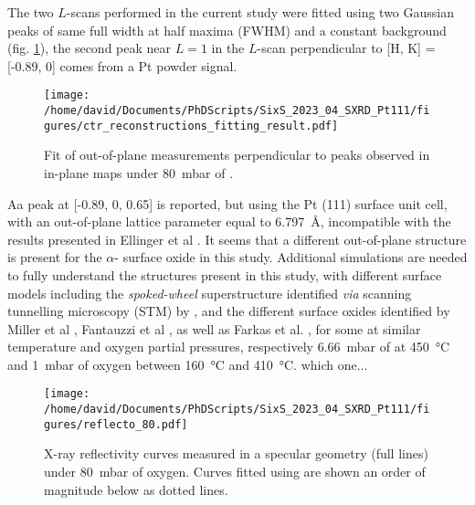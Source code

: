 The two $L$-scans performed in the current study were fitted using two Gaussian peaks of same full width at half maxima (FWHM) and a constant background (fig. \ref{fig:LScans80Fit}), the second peak near $L=1$ in the $L$-scan perpendicular to [H, K] = [-0.89, 0] comes from a Pt powder signal.

\begin{figure}[!htb]
    \centering
    \texttt{[image: /home/david/Documents/PhDScripts/SixS\_2023\_04\_SXRD\_Pt111/figures/ctr\_reconstructions\_fitting\_result.pdf]}
    \caption{
        Fit of out-of-plane measurements perpendicular to peaks observed in in-plane maps under \qty{80}{\milli\bar} of .
    }
    \label{fig:LScans80Fit}
\end{figure}

Aa peak at [-0.89, 0, 0.65] is reported, but using the Pt (111) surface unit cell, with an out-of-plane lattice parameter equal to \qty{6.797}{\angstrom}, incompatible with the results presented in Ellinger et al \parencite*{Ellinger2008}.
It seems that a different out-of-plane structure is present for the $\alpha$- surface oxide in this study.
Additional simulations are needed to fully understand the structures present in this study, with different surface models including the \textit{spoked-wheel} superstructure identified \textit{via} scanning tunnelling microscopy (STM) by \cite{VanSpronsen2017, Boden2022}, and the different surface oxides identified by Miller et al \parencite*{Miller2011, Miller2014}, Fantauzzi et al \parencite*{Fantauzzi2017}, as well as Farkas et al. \parencite*{Farkas2017}, for some at similar temperature and oxygen partial pressures, respectively \qty{6.66}{\milli\bar} of  at \qty{450}{\degreeCelsius} and \qty{1}{\milli\bar} of oxygen between \qty{160}{\degreeCelsius} and \qty{410}{\degreeCelsius}.
\textcolor{Important}{which one...}

\begin{figure}[!htb]
    \centering
    \texttt{[image: /home/david/Documents/PhDScripts/SixS\_2023\_04\_SXRD\_Pt111/figures/reflecto\_80.pdf]}
    \caption{
    	X-ray reflectivity curves measured in a specular geometry (full lines) under \qty{80}{\milli\bar} of oxygen.
    	Curves fitted using  are shown an order of magnitude below as dotted lines.
    }
    \label{fig:Reflecto80}
\end{figure}

